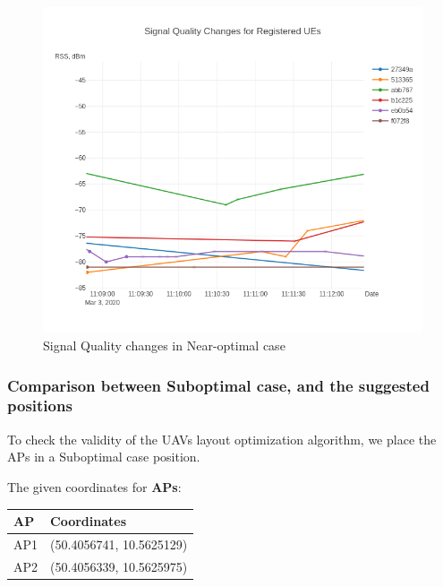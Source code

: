 \begin{figure}[H]
	\centering
	\includegraphics[width=\linewidth,keepaspectratio]{images/Exp4_Near_Optimal.png}
\caption{Signal Quality changes in Near-optimal case}
\end{figure}

\subsubsection{Comparison between Suboptimal case, and the suggested
positions}\label{comparison-between-suboptimal-case-and-the-suggested-positions}

To check the validity of the UAVs layout optimization algorithm, we
place the APs in a Suboptimal case position.

The given coordinates for \textbf{APs}:

\begin{longtable}[]{@{}ll@{}}
\toprule
AP & Coordinates\tabularnewline
\midrule
\endhead
AP1 & (50.4056741, 10.5625129)\tabularnewline
AP2 & (50.4056339, 10.5625975)\tabularnewline
\bottomrule
\end{longtable}

